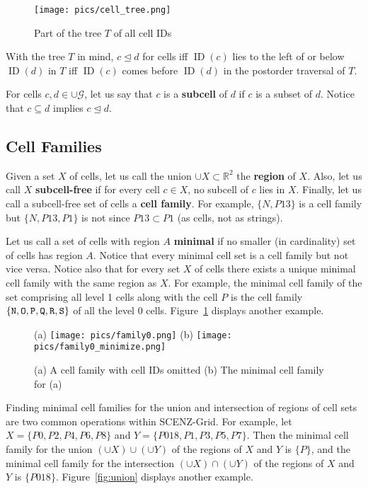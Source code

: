 \documentclass[12pt,a4paper]{amsart}
\numberwithin{figure}{section}
\newcommand{\hl}[1]{\textnormal{\textbf{#1}}} %
\newcommand{\reals}{\mathbb{R}}
\newcommand{\cG}{\mathcal{G}}
\newcommand{\cle}{\trianglelefteq}
\DeclareMathOperator{\id}{ID}
\begin{document}
\begin{figure}[htb]
\texttt{[image: pics/cell\_tree.png]}
\caption{
Part of the tree $T$ of all cell IDs
}
\end{figure}
\label{fig:tree}

With the tree $T$ in mind, $c \cle d$ for cells iff $\id(c)$ lies to the left of or below $\id(d)$ in $T$ iff $\id(c)$ comes before $\id(d)$ in the postorder traversal of $T$.

For cells $c, d \in \cup \cG$, let us say that $c$ is a \hl{subcell} of $d$ if $c$ is a subset of $d$.
Notice that $c \subseteq d$ implies $c \cle d$.

\subsection{Cell Families}

Given a set $X$ of cells, let us call the union $\cup X \subset \reals^2$ the \hl{region} of $X$.
Also, let us call $X$ \hl{subcell-free} if for every cell $c \in X$, no subcell  of $c$ lies in $X$. 
Finally, let us call a subcell-free set of cells a \hl{cell family}.
For example, $\{N, P13\}$ is a cell family but  $\{N, P13, P1\}$ is not since $P13 \subset P1$ (as cells, not as strings).

Let us call a set of cells with region $A$ \hl{minimal} if no smaller (in cardinality) set of cells has region $A$.
Notice that every minimal cell set is a cell family but not vice versa.
Notice also that for every set $X$ of cells there exists a unique minimal cell family with the same region as $X$.
For example, the minimal cell family of the set comprising all level 1 cells along with the cell $P$ is the cell family $\{\tt{N, O, P, Q, R, S}\}$ of all the level 0 cells. 
Figure~\ref{fig:minimize} displays another example.

\begin{figure}[htb]
(a) \texttt{[image: pics/family0.png]}
(b) \texttt{[image: pics/family0\_minimize.png]} 
\caption{
(a) A cell family with cell IDs omitted 
(b) The minimal cell family for (a) 
}
\label{fig:minimize}
\end{figure}

Finding minimal cell families for the union and intersection of regions of cell sets are two common operations within SCENZ-Grid.
For example, let $X = \{P0, P2, P4, P6, P8\}$ and $Y = \{P018, P1, P3, P5, P7\}$.
Then the minimal cell family for the union $(\cup X) \cup (\cup Y)$ of the regions of $X$ and $Y$ is $\{P\}$, and the minimal cell family for the intersection $(\cup X) \cap (\cup Y)$ of the regions of $X$ and $Y$ is $\{P018\}$. 
Figure~\ref{fig:union} displays another example.
\end{document}
